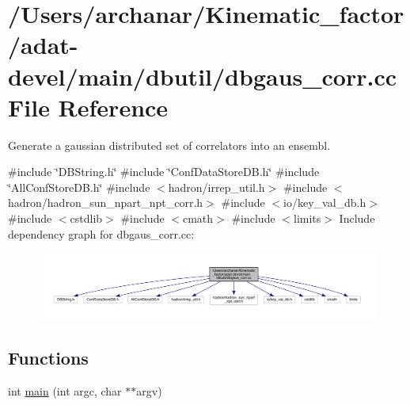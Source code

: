 \hypertarget{adat-devel_2main_2dbutil_2dbgaus__corr_8cc}{}\section{/\+Users/archanar/\+Kinematic\+\_\+factor/adat-\/devel/main/dbutil/dbgaus\+\_\+corr.cc File Reference}
\label{adat-devel_2main_2dbutil_2dbgaus__corr_8cc}


Generate a gaussian distributed set of correlators into an ensembl.  


{\ttfamily \#include \char`\"{}D\+B\+String.\+h\char`\"{}}\newline
{\ttfamily \#include \char`\"{}Conf\+Data\+Store\+D\+B.\+h\char`\"{}}\newline
{\ttfamily \#include \char`\"{}All\+Conf\+Store\+D\+B.\+h\char`\"{}}\newline
{\ttfamily \#include $<$hadron/irrep\+\_\+util.\+h$>$}\newline
{\ttfamily \#include $<$hadron/hadron\+\_\+sun\+\_\+npart\+\_\+npt\+\_\+corr.\+h$>$}\newline
{\ttfamily \#include $<$io/key\+\_\+val\+\_\+db.\+h$>$}\newline
{\ttfamily \#include $<$cstdlib$>$}\newline
{\ttfamily \#include $<$cmath$>$}\newline
{\ttfamily \#include $<$limits$>$}\newline
Include dependency graph for dbgaus\+\_\+corr.\+cc\+:
\nopagebreak
\begin{figure}[H]
\begin{center}
\leavevmode
\includegraphics[width=350pt]{d9/de2/adat-devel_2main_2dbutil_2dbgaus__corr_8cc__incl}
\end{center}
\end{figure}
\subsection*{Functions}
\begin{DoxyCompactItemize}
\item 
int \mbox{\hyperlink{adat-devel_2main_2dbutil_2dbgaus__corr_8cc_a3c04138a5bfe5d72780bb7e82a18e627}{main}} (int argc, char $\ast$$\ast$argv)
\end{DoxyCompactItemize}


